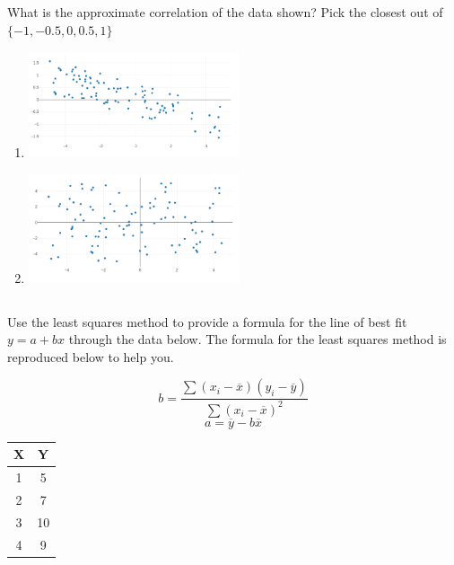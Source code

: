 \documentclass[twocolumn]{article}
\begin{document}
\subsection{}

    What is the approximate correlation of the data shown? Pick the closest out of $\{-1, -0.5, 0, 0.5, 1\}$

    \begin{enumerate}
        \item\includegraphics[width=0.49\textwidth]{correlation}
        \item \includegraphics[width=0.49\textwidth]{nocorrelation}
    \end{enumerate}

\subsection{}

    Use the least squares method to provide a formula for the line of best fit $y = a + bx$ through the data below. The formula for the least squares method is reproduced below to help you.

    \begin{multicols}{2}
    $$ b = \frac{\sum{(x_i - \overline{x})(y_i - \overline{y})}}{\sum{(x_i - \overline{x})^2}} $$
    $$ a = \overline{y} - b\overline{x}$$
    \begin{center}
        \begin{tabular}{c | c}
            \toprule
            X & Y  \\
            \midrule
            1 & 5 \\
            2 & 7 \\
            3 & 10 \\
            4 & 9 \\
            \bottomrule
        \end{tabular}        
    \end{center}
\end{multicols}
\end{document}

